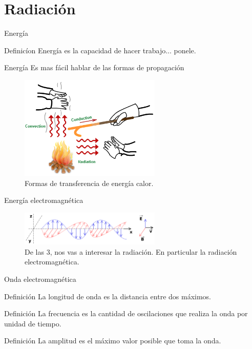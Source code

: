 \documentclass[handout]{beamer}
\begin{document}
\section{Radiación}
\label{sec:radiacion}
\begin{frame}{Energía}
  \begin{block}{Definicíon}
    Energía es la capacidad de hacer trabajo... \pause ponele.
  \end{block}
\end{frame}

\begin{frame}{Energía}
  Es mas fácil hablar de las formas de propagación
  \begin{figure}
    \includegraphics[width=0.6\textwidth]{imagenes/types-of-heat-transfer.png}
    \caption{Formas de transferencia de energía calor.}
  \end{figure}
\end{frame}


\begin{frame}{Energía electromagnética}
  \begin{figure}
    \includegraphics[width=0.6\textwidth]{imagenes/Onde_electromagnetique.png}
    \caption{De las 3, nos vas a interesar la radiación. En particular la radiación electromagnética.}
  \end{figure}
\end{frame}

\begin{frame}{Onda electromagnética}
  \begin{block}{Definición}
    La longitud de onda es la distancia entre dos máximos.
  \end{block}
  \begin{block}{Definición}
    La frecuencia es la cantidad de oscilaciones que realiza la onda por unidad de tiempo.
  \end{block}\pause
  \begin{block}{Definición}
    La amplitud es el máximo valor posible que toma la onda.
  \end{block}
\end{frame}
\end{document}
